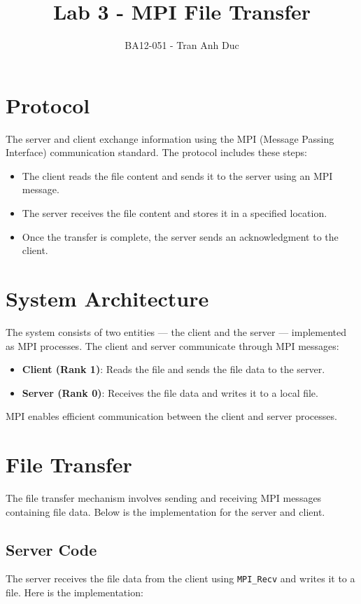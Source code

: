 \documentclass[a4paper,12pt]{article}
\title{Lab 3 - MPI File Transfer}
\author{BA12-051 - Tran Anh Duc}
\begin{document}
\maketitle

\section{Protocol}
The server and client exchange information using the MPI (Message Passing Interface) communication standard. The protocol includes these steps:
\begin{itemize}
    \item The client reads the file content and sends it to the server using an MPI message.
    \item The server receives the file content and stores it in a specified location.
    \item Once the transfer is complete, the server sends an acknowledgment to the client.
\end{itemize}

\section{System Architecture}
The system consists of two entities — the client and the server — implemented as MPI processes. The client and server communicate through MPI messages:
\begin{itemize}
    \item \textbf{Client (Rank 1)}: Reads the file and sends the file data to the server.
    \item \textbf{Server (Rank 0)}: Receives the file data and writes it to a local file.
\end{itemize}
MPI enables efficient communication between the client and server processes.

\section{File Transfer}
The file transfer mechanism involves sending and receiving MPI messages containing file data. Below is the implementation for the server and client.

\subsection{Server Code}
The server receives the file data from the client using \texttt{MPI\_Recv} and writes it to a file. Here is the implementation:
\end{document}
